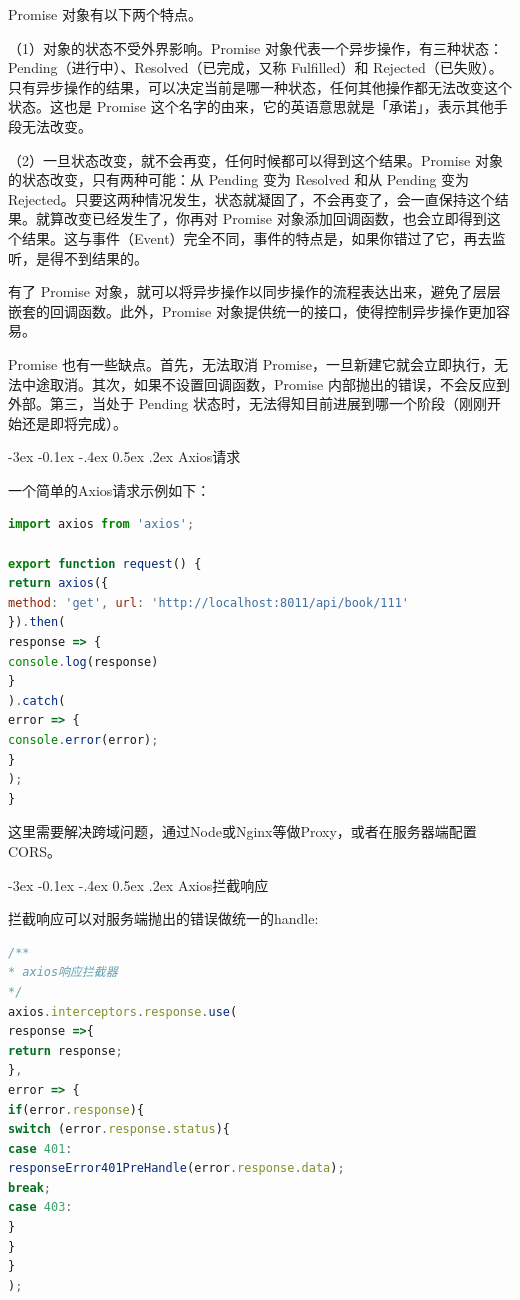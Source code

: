 \documentclass[11pt,fleqn]{book}
\makeatletter
\numberwithin{dummy}{section}
\theoremstyle{ocrenumbox}
\theoremstyle{blacknumex}
\theoremstyle{blacknumbox}
\theoremstyle{ocrenum}
\renewcommand{\subsection}{\@startsection {subsection}{2}{\z@}
	{-3ex \@plus -0.1ex \@minus -.4ex}
	{0.5ex \@plus.2ex }
	{\normalfont\sffamily\bfseries}}
\newlength\esp
\makeatother
\begin{document}
Promise 对象有以下两个特点。

（1）对象的状态不受外界影响。Promise 对象代表一个异步操作，有三种状态：Pending（进行中）、Resolved（已完成，又称 Fulfilled）和 Rejected（已失败）。只有异步操作的结果，可以决定当前是哪一种状态，任何其他操作都无法改变这个状态。这也是 Promise 这个名字的由来，它的英语意思就是「承诺」，表示其他手段无法改变。

（2）一旦状态改变，就不会再变，任何时候都可以得到这个结果。Promise 对象的状态改变，只有两种可能：从 Pending 变为 Resolved 和从 Pending 变为 Rejected。只要这两种情况发生，状态就凝固了，不会再变了，会一直保持这个结果。就算改变已经发生了，你再对 Promise 对象添加回调函数，也会立即得到这个结果。这与事件（Event）完全不同，事件的特点是，如果你错过了它，再去监听，是得不到结果的。

有了 Promise 对象，就可以将异步操作以同步操作的流程表达出来，避免了层层嵌套的回调函数。此外，Promise 对象提供统一的接口，使得控制异步操作更加容易。

Promise 也有一些缺点。首先，无法取消 Promise，一旦新建它就会立即执行，无法中途取消。其次，如果不设置回调函数，Promise 内部抛出的错误，不会反应到外部。第三，当处于 Pending 状态时，无法得知目前进展到哪一个阶段（刚刚开始还是即将完成）。

\subsection{Axios请求}

一个简单的Axios请求示例如下：

\begin{lstlisting}[language=JavaScript]
import axios from 'axios';

export function request() {
return axios({
method: 'get', url: 'http://localhost:8011/api/book/111'
}).then(
response => {
console.log(response)
}
).catch(
error => {
console.error(error);
}
);
}
\end{lstlisting}


这里需要解决跨域问题，通过Node或Nginx等做Proxy，或者在服务器端配置CORS。

\subsection{Axios拦截响应}

拦截响应可以对服务端抛出的错误做统一的handle:

\begin{lstlisting}[language=JavaScript]
/**
* axios响应拦截器
*/
axios.interceptors.response.use(
response =>{
return response;
},
error => {
if(error.response){
switch (error.response.status){
case 401:
responseError401PreHandle(error.response.data);
break;
case 403:
}
}
}
);
\end{lstlisting}
\end{document}

